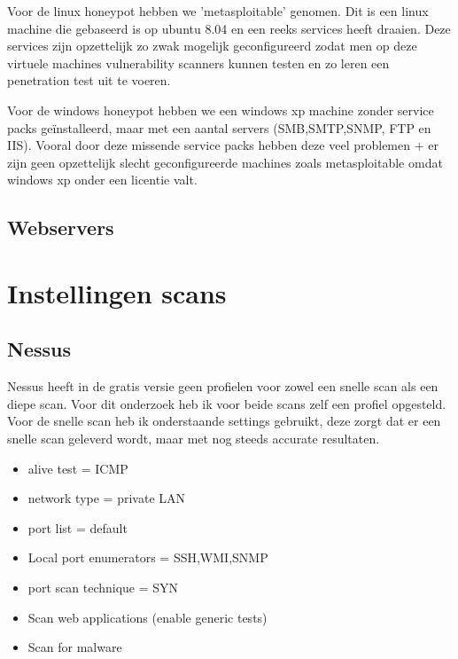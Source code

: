 Voor de linux honeypot hebben we 'metasploitable' genomen. Dit is een linux machine die gebaseerd is op ubuntu 8.04 en een reeks services heeft draaien. Deze services zijn opzettelijk zo zwak mogelijk geconfigureerd zodat men op deze virtuele machines vulnerability scanners kunnen testen en zo leren een penetration test uit te voeren.

Voor de windows honeypot hebben we een windows xp machine zonder service packs geïnstalleerd, maar met een aantal servers (SMB,SMTP,SNMP, FTP en IIS). Vooral door deze missende service packs hebben deze veel problemen + er zijn geen opzettelijk slecht geconfigureerde machines zoals metasploitable omdat windows xp onder een licentie valt. 

\subsection{Webservers}



\section{Instellingen scans}

\subsection{Nessus}

Nessus heeft in de gratis versie geen profielen voor zowel een snelle scan als een diepe scan. Voor dit onderzoek heb ik voor beide scans zelf een profiel opgesteld. Voor de snelle scan heb ik onderstaande settings gebruikt, deze zorgt dat er een snelle scan geleverd wordt, maar met nog steeds accurate resultaten.

\begin{itemize}
\item alive test = ICMP
\item network type = private LAN
\item port list = default
\item Local port enumerators = SSH,WMI,SNMP
\item port scan technique = SYN
\item Scan web applications (enable generic tests)
\item Scan for malware
\end{itemize}


